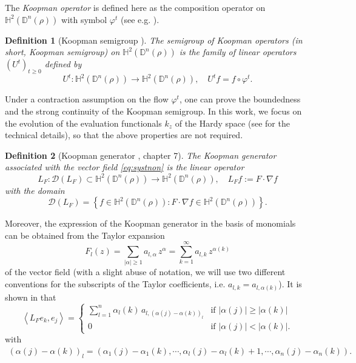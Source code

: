 \documentclass{article}
\newtheorem{definition}{Definition}
\begin{document}
The \emph{Koopman operator} is defined here as the composition operator on $\mathbb{H}^2(\mathbb{D}^n(\rho))$ with symbol $\varphi^t$ (see e.g. \cite{BDF, FJ, AGS}).
\begin{definition}[Koopman semigroup \cite{ALMCM}] 
The semigroup of Koopman operators (in short, Koopman semigroup) on $\mathbb{H}^2(\mathbb{D}^n(\rho))$ is the family of linear operators $\left(U^t\right)_{t\geq 0
}$ defined by $$U^t:\mathbb{H}^2(\mathbb{D}^n(\rho))\rightarrow \mathbb{H}^2(\mathbb{D}^n(\rho)), \quad U^tf=f\circ \varphi^t.$$
\end{definition}
Under a contraction assumption on the flow $\varphi^t$, one can prove the boundedness and the strong continuity of the Koopman semigroup. In this work, we focus on the evolution of the evaluation functionals $k_z$ of the Hardy space (see \cite{CMZAM2} for the technical details), so that the above properties are not required.

\begin{definition}[Koopman generator \cite{ALMCM}, chapter 7] The Koopman generator associated with the vector field \eqref{eq:systnon} is the linear operator
\begin{equation*}
\label{eq:koopmangenerator}
L_F: \mathcal{D}(L_F) \subset \mathbb{H}^2(\mathbb{D}^n(\rho)) \rightarrow \mathbb{H}^2(\mathbb{D}^n(\rho)), \quad L_F f:=F \cdot \nabla f
\end{equation*}
with the domain \[\mathcal{D}(L_F)=\left\lbrace f\in \mathbb{H}^2(\mathbb{D}^n(\rho)): F \cdot \nabla f\in \mathbb{H}^2(\mathbb{D}^n(\rho)) \right\rbrace .\]
\end{definition}
 

Moreover, the expression of the Koopman generator in the basis of monomials can be obtained from the Taylor expansion 
\begin{equation}
\label{eq:Taylor}
F_l(z) = \sum_{\vert \alpha \vert\geq 1} a_{l,\alpha} \, z^\alpha = \sum_{k=1}^\infty a_{l,k} \, z^{\alpha(k)}
\end{equation}
of the vector field (with a slight abuse of notation, we will use two different conventions for the subscripts of the Taylor coefficients, i.e. $a_{l,k}=a_{l,\alpha(k)}$). It is shown in \cite{CMZAM2} that
\begin{equation}\label{eq:koop_matrix1}
\left\langle L_Fe_{k},e_{j} \right\rangle = %
\begin{cases}\sum_{l=1}^n \alpha_l(k)  \, a_{l,(\alpha(j)-\alpha(k))_l} & \textrm{if } |\alpha(j) |\geq |\alpha(k)| \\
0 &  \textrm{if } |\alpha(j) |< |\alpha(k)|.
\end{cases}
\end{equation}
with
\begin{multline*}
(\alpha(j)-\alpha(k))_l=(\alpha_1(j)-\alpha_1(k),\cdots,\alpha_l(j)-\alpha_l(k)+1, \cdots, \alpha_n(j)-\alpha_n(k)).
\end{multline*}
\end{document}
